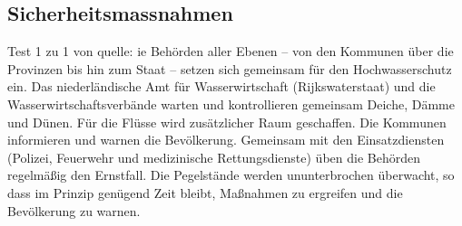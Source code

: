 \subsection{Sicherheitsmassnahmen}  
Test 1 zu 1 von quelle:
\newline\newline
ie Behörden aller Ebenen – von den Kommunen über die Provinzen bis 
hin zum Staat – setzen sich gemeinsam für den Hochwasserschutz ein.
 Das niederländische Amt für Wasserwirtschaft (Rijkswaterstaat) und
  die Wasserwirtschaftsverbände warten und kontrollieren gemeinsam 
  Deiche, Dämme und Dünen. Für die Flüsse wird zusätzlicher Raum 
  geschaffen. Die Kommunen informieren und warnen die Bevölkerung.
   Gemeinsam mit den Einsatzdiensten (Polizei, Feuerwehr und 
   medizinische Rettungsdienste) üben die Behörden regelmäßig
    den Ernstfall. Die Pegelstände werden ununterbrochen überwacht, 
    so dass im Prinzip genügend Zeit bleibt, Maßnahmen zu ergreifen
     und die Bevölkerung zu warnen.  

 